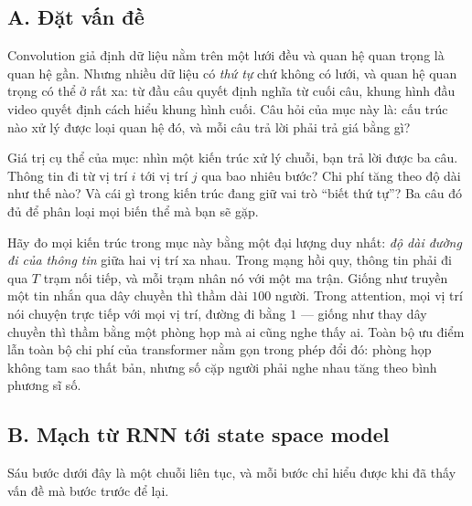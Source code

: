 \documentclass[../../../deep_learning.tex]{subfiles}
\begin{document}
\subsection{A. Đặt vấn đề}
Convolution giả định dữ liệu nằm trên một lưới đều và quan hệ quan trọng là quan hệ gần. Nhưng nhiều dữ liệu có \emph{thứ tự} chứ không có lưới, và quan hệ quan trọng có thể ở rất xa: từ đầu câu quyết định nghĩa từ cuối câu, khung hình đầu video quyết định cách hiểu khung hình cuối. Câu hỏi của mục này là: cấu trúc nào xử lý được loại quan hệ đó, và mỗi câu trả lời phải trả giá bằng gì?

Giá trị cụ thể của mục: nhìn một kiến trúc xử lý chuỗi, bạn trả lời được ba câu. Thông tin đi từ vị trí \(i\) tới vị trí \(j\) qua bao nhiêu bước? Chi phí tăng theo độ dài như thế nào? Và cái gì trong kiến trúc đang giữ vai trò ``biết thứ tự''? Ba câu đó đủ để phân loại mọi biến thể mà bạn sẽ gặp.

\begin{trucgiac}
Hãy đo mọi kiến trúc trong mục này bằng một đại lượng duy nhất: \emph{độ dài đường đi của thông tin} giữa hai vị trí xa nhau. Trong mạng hồi quy, thông tin phải đi qua \(T\) trạm nối tiếp, và mỗi trạm nhân nó với một ma trận. Giống như truyền một tin nhắn qua dây chuyền thì thầm dài \(100\) người. Trong attention, mọi vị trí nói chuyện trực tiếp với mọi vị trí, đường đi bằng \(1\) --- giống như thay dây chuyền thì thầm bằng một phòng họp mà ai cũng nghe thấy ai. Toàn bộ ưu điểm lẫn toàn bộ chi phí của transformer nằm gọn trong phép đổi đó: phòng họp không tam sao thất bản, nhưng số cặp người phải nghe nhau tăng theo bình phương sĩ số.
\end{trucgiac}

\subsection{B. Mạch từ RNN tới state space model}
Sáu bước dưới đây là một chuỗi liên tục, và mỗi bước chỉ hiểu được khi đã thấy vấn đề mà bước trước để lại.
\end{document}
